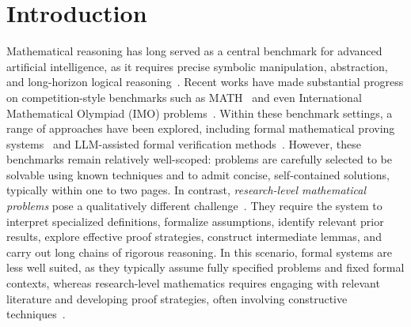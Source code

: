 \documentclass{article}
\begin{document}
\section{Introduction}
\vspace{-4pt}
Mathematical reasoning has long served as a central benchmark for advanced artificial intelligence, as it requires precise symbolic manipulation, abstraction, and long-horizon logical reasoning~\cite{newell1956logic}. Recent works have made substantial progress on competition-style benchmarks such as MATH~\cite{hendrycks2021math} and even International Mathematical Olympiad (IMO) problems~\citep{trinh2024alphageometry,azerbayev2023llemma}. Within these benchmark settings, a range of approaches have been explored, including formal mathematical proving systems~\citep{Lean4,rocktaschel2017end,polu2020gpt} and LLM-assisted formal verification methods~\citep{wu2022autoformalization,yang2023leandojo,alphaproof2024,novikov2025alphaevolvecodingagentscientific,xin2024deepseekprover}. However, these benchmarks remain relatively well-scoped: problems are carefully selected to be solvable using known techniques and to admit concise, self-contained solutions, typically within one to two pages. In contrast, \emph{research-level mathematical problems} pose a qualitatively different challenge~\citep{feng2026autonomousmathematicsresearch,karpathy_autoresearch,zimmer2026agenticresearcherpracticalguide}. They require the system to interpret specialized definitions, formalize assumptions, identify relevant prior results, explore effective proof strategies, construct intermediate lemmas, and carry out long chains of rigorous reasoning. In this scenario, formal systems are less well suited, as they typically assume fully specified problems and fixed formal contexts, whereas research-level mathematics requires engaging with relevant literature and developing proof strategies, often involving constructive techniques~\citep{abouzaid2026first}.
\end{document}
